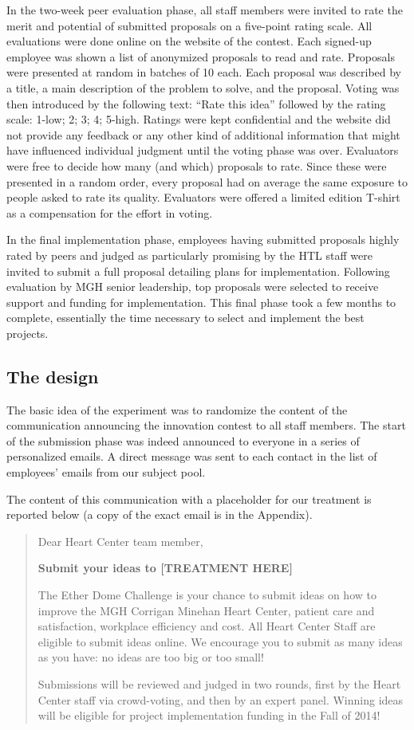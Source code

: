 \documentclass[12pt, titlepage]{article}
\begin{document}
In the two-week peer evaluation phase, all staff members were invited to
rate the merit and potential of submitted proposals on a five-point
rating scale. All evaluations were done online on the website of the
contest. Each signed-up employee was shown a list of anonymized
proposals to read and rate. Proposals were presented at random in
batches of 10 each. Each proposal was described by a title, a main
description of the problem to solve, and the proposal. Voting was then
introduced by the following text: ``Rate this idea'' followed by the
rating scale: 1-low; 2; 3; 4; 5-high. Ratings were kept confidential and
the website did not provide any feedback or any other kind of additional
information that might have influenced individual judgment until the
voting phase was over. Evaluators were free to decide how many (and
which) proposals to rate. Since these were presented in a random order,
every proposal had on average the same exposure to people asked to rate
its quality. Evaluators were offered a limited edition T-shirt as a
compensation for the effort in voting.

In the final implementation phase, employees having submitted proposals
highly rated by peers and judged as particularly promising by the HTL
staff were invited to submit a full proposal detailing plans for
implementation. Following evaluation by MGH senior leadership, top
proposals were selected to receive support and funding for
implementation. This final phase took a few months to complete,
essentially the time necessary to select and implement the best
projects.

\subsection{The design}\label{the-design}

The basic idea of the experiment was to randomize the content of the
communication announcing the innovation contest to all staff members.
The start of the submission phase was indeed announced to everyone in a
series of personalized emails. A direct message was sent to each contact
in the list of employees' emails from our subject pool.

The content of this communication with a placeholder for our treatment
is reported below (a copy of the exact email is in the Appendix).

\begin{quote}
Dear Heart Center team member,

\textbf{Submit your ideas to {[}TREATMENT HERE{]}}

The Ether Dome Challenge is your chance to submit ideas on how to
improve the MGH Corrigan Minehan Heart Center, patient care and
satisfaction, workplace efficiency and cost. All Heart Center Staff are
eligible to submit ideas online. We encourage you to submit as many
ideas as you have: no ideas are too big or too small!

Submissions will be reviewed and judged in two rounds, first by the
Heart Center staff via crowd-voting, and then by an expert panel.
Winning ideas will be eligible for project implementation funding in the
Fall of 2014!
\end{quote}
\end{document}
